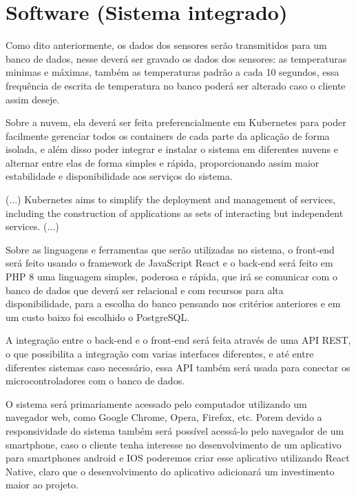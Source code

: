 \section{Software (Sistema integrado)}

    Como dito anteriormente, os dados 
    dos sensores serão transmitidos para um banco de dados,
    nesse deverá ser gravado os dados dos sensores:
    as temperaturas minimas e máximas, também as temperaturas 
    padrão a cada 10 segundos, essa frequência de 
    escrita de temperatura no banco poderá ser alterado caso o 
    cliente assim deseje.

    Sobre a nuvem, ela deverá ser feita preferencialmente 
    em Kubernetes para poder facilmente gerenciar todos os containers 
    de cada parte da aplicação de forma isolada, e além disso 
    poder integrar e instalar o sistema em diferentes nuvens
    e alternar entre elas de forma simples e rápida, 
    proporcionando assim maior estabilidade e disponibilidade
    aos serviços do sistema.

    \begin{citacao}[english]
        (...)
        Kubernetes aims to simplify the deployment and management 
        of services, including the construction of applications 
        as sets of interacting but independent services.
        (...)
        \cite{brewer2015kubernetes}
    \end{citacao}

    Sobre as linguagens e ferramentas que serão utilizadas
    no sistema, o front-end será feito usando o framework 
    de JavaScript React e o back-end será feito em PHP 8
    uma linguagem simples, poderosa e rápida, que irá se comunicar
    com o banco de dados que deverá ser relacional e com recursos
    para alta disponibilidade, para a escolha do banco pensando nos
    critérios anteriores e em um custo baixo foi escolhido o 
    PostgreSQL.

    A integração entre o back-end e o front-end será feita 
    através de uma API REST, o que possibilita a integração 
    com varias interfaces diferentes, e até entre diferentes
    sistemas caso necessário, essa API também será usada 
    para conectar os microcontroladores com o banco de dados.

    O sistema será primariamente acessado pelo computador
    utilizando um navegador web, como Google Chrome, 
    Opera, Firefox, etc. 
    Porem devido a responsividade do sistema também será
    possível acessá-lo pelo navegador de um smartphone,
    caso o cliente tenha interesse no desenvolvimento de
    um aplicativo para smartphones android e IOS
    poderemos criar esse aplicativo utilizando 
    React Native, claro que o desenvolvimento do aplicativo
    adicionará um investimento maior ao projeto.


